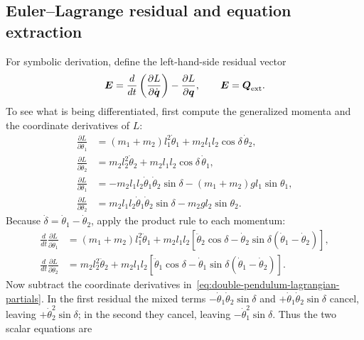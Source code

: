 \documentclass[../main.tex]{subfiles}
\begin{document}
\subsection{Euler--Lagrange residual and equation extraction}

For symbolic derivation, define the left-hand-side residual vector
\begin{equation}
	\boldsymbol{E} = \frac{d}{dt}\left(\frac{\partial L}{\partial\dot{\boldsymbol{q}}}\right)
		- \frac{\partial L}{\partial\boldsymbol{q}},
	\qquad \boldsymbol{E}=\boldsymbol{Q}_{\mathrm{ext}}.
	\label{eq:double-pendulum-el-residual}
\end{equation}
	To see what is being differentiated, first compute the generalized momenta and the coordinate derivatives of $L$:
	\begin{equation}
	\begin{aligned}
	\frac{\partial L}{\partial\dot\theta_1}
	&=(m_1+m_2)l_1^2\dot\theta_1
	+m_2l_1l_2\cos\delta\,\dot\theta_2,\\
	\frac{\partial L}{\partial\dot\theta_2}
	&=m_2l_2^2\dot\theta_2
	+m_2l_1l_2\cos\delta\,\dot\theta_1,\\
	\frac{\partial L}{\partial\theta_1}
	&=-m_2l_1l_2\dot\theta_1\dot\theta_2\sin\delta
	-(m_1+m_2)gl_1\sin\theta_1,\\
	\frac{\partial L}{\partial\theta_2}
	&=m_2l_1l_2\dot\theta_1\dot\theta_2\sin\delta
	-m_2gl_2\sin\theta_2.
	\end{aligned}
	\label{eq:double-pendulum-lagrangian-partials}
	\end{equation}
	Because $\dot\delta=\dot\theta_1-\dot\theta_2$, apply the product rule to each momentum:
	\begin{equation}
	\begin{aligned}
	\frac{d}{dt}\frac{\partial L}{\partial\dot\theta_1}
	&=(m_1+m_2)l_1^2\ddot\theta_1
	+m_2l_1l_2\left[\ddot\theta_2\cos\delta
	-\dot\theta_2\sin\delta(\dot\theta_1-\dot\theta_2)\right],\\
	\frac{d}{dt}\frac{\partial L}{\partial\dot\theta_2}
	&=m_2l_2^2\ddot\theta_2
	+m_2l_1l_2\left[\ddot\theta_1\cos\delta
	-\dot\theta_1\sin\delta(\dot\theta_1-\dot\theta_2)\right].
	\end{aligned}
	\label{eq:double-pendulum-momentum-rates}
	\end{equation}
	Now subtract the coordinate derivatives in~\eqref{eq:double-pendulum-lagrangian-partials}. In the first residual the mixed terms $-\dot\theta_1\dot\theta_2\sin\delta$ and $+\dot\theta_1\dot\theta_2\sin\delta$ cancel, leaving $+\dot\theta_2^2\sin\delta$; in the second they cancel, leaving $-\dot\theta_1^2\sin\delta$. Thus the two scalar equations are
\end{document}
